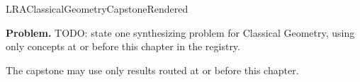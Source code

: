 \ifcsname LRAClassicalGeometryCapstoneRendered\endcsname
\else
\expandafter\gdef\csname LRAClassicalGeometryCapstoneRendered\endcsname{}

\newpage
{}
\label{cap:classical-geometry}

\begin{tcolorbox}[
  colback=gray!6,
  colframe=gray!40,
  arc=2pt,
  left=8pt, right=8pt, top=6pt, bottom=6pt,
  title={\small\textbf{Capstone Problem}},
  fonttitle=\small\bfseries
]
\textbf{Problem.}
TODO: state one synthesizing problem for Classical Geometry, using only concepts at or
before this chapter in the registry.
\end{tcolorbox}

\begin{remark*}
The capstone may use only results routed at or before this chapter.
\end{remark*}

\clearpage
\fi
